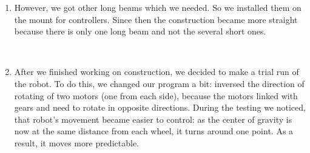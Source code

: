 \begin{enumerate}
\begin{enumerate}
        \item However, we got other long beams which we needed. So we installed them on the mount for controllers. Since then the construction became more straight because there is only one long beam and not the several short ones.
        \begin{figure}[H]
	  	  \begin{minipage}[h]{0.2\linewidth}
	  	    \center  
	  	  \end{minipage}
	  	  \begin{minipage}[h]{0.6\linewidth}
	  		\caption{}
	  	  \end{minipage}
	   \end{figure}
	   
	   \item After we finished working on construction, we decided to make a trial run of the robot. To do this, we changed our program a bit: inversed the direction of rotating of two motors (one from each side), because the motors linked with gears and need to rotate in opposite directions. During the testing we noticed, that robot's movement became easier to control: as the center of gravity is now at the same distance from each wheel, it turns around one point. As a result, it moves more predictable.
	   

\end{enumerate}
\end{enumerate}
